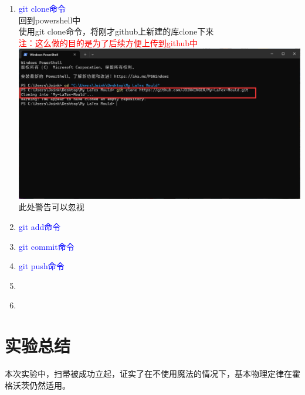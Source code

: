 \documentclass[12pt,a4paper,UTF8]{article}
\begin{document}
\begin{enumerate}
        \item \textcolor{blue}{git clone命令}\\
        回到powershell中\\
        使用git clone命令，将刚才github上新建的库clone下来\\[6pt]
        \textcolor{red}{注：这么做的目的是为了后续方便上传到github中}\\
        \includegraphics[scale=0.25]{pictures/git/16.png}
        此处警告可以忽视
        
        \item \textcolor{blue}{git add命令}\\
        
        \item \textcolor{blue}{git commit命令}\\
        
        \item \textcolor{blue}{git push命令}\\
        
        \item \textcolor{blue}{}\\
        \item \textcolor{blue}{}\\
    \end{enumerate}

    \section{实验总结}
    本次实验中，扫帚被成功立起，证实了在不使用魔法的情况下，基本物理定律在霍格沃茨仍然适用。
\end{document}
